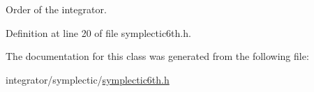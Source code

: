 Order of the integrator. 



Definition at line 20 of file symplectic6th.\+h.



The documentation for this class was generated from the following file\+:\begin{DoxyCompactItemize}
\item 
integrator/symplectic/\mbox{\hyperlink{symplectic6th_8h}{symplectic6th.\+h}}\end{DoxyCompactItemize}
